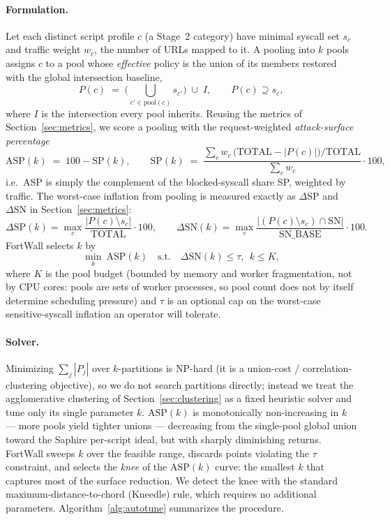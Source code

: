 \paragraph{Formulation.}
Let each distinct script profile $c$ (a Stage~2 category) have minimal syscall
set $s_c$ and traffic weight $w_c$, the number of URLs mapped to it. A pooling
into $k$ pools assigns $c$ to a pool whose \emph{effective} policy is the union
of its members restored with the global intersection baseline,
\begin{equation}
P(c) \;=\; \Big(\textstyle\bigcup_{c'\in \mathrm{pool}(c)} s_{c'}\Big) \;\cup\; I,
\qquad P(c)\supseteq s_c,
\end{equation}
where $I$ is the intersection every pool inherits. Reusing the metrics of
Section~\ref{sec:metrics}, we score a pooling with the request-weighted
\emph{attack-surface percentage}
\begin{equation}
\mathrm{ASP}(k) \;=\; 100 - \mathrm{SP}(k),
\qquad
\mathrm{SP}(k) \;=\; \frac{\sum_c w_c\,\big(\mathrm{TOTAL}-|P(c)|\big)/\mathrm{TOTAL}}{\sum_c w_c}\cdot 100,
\end{equation}
i.e.\ ASP is simply the complement of the blocked-syscall share SP, weighted by
traffic. The worst-case inflation from pooling is measured exactly as
$\Delta\mathrm{SP}$ and $\Delta\mathrm{SN}$ in Section~\ref{sec:metrics}:
\begin{equation}
\Delta\mathrm{SP}(k)=\max_c \frac{|P(c)\setminus s_c|}{\mathrm{TOTAL}}\cdot 100,
\qquad
\Delta\mathrm{SN}(k)=\max_c \frac{|(P(c)\setminus s_c)\cap \mathrm{SN}|}{\mathrm{SN\_BASE}}\cdot 100 .
\end{equation}
FortWall selects $k$ by
\begin{equation}
\min_{k}\ \mathrm{ASP}(k)
\quad\text{s.t.}\quad
\Delta\mathrm{SN}(k)\le \tau,\ \ k\le K,
\label{eq:autotune}
\end{equation}
where $K$ is the pool budget (bounded by memory and worker fragmentation, not by
CPU cores: pools are sets of worker processes, so pool count does not by itself
determine scheduling pressure) and $\tau$ is an optional cap on the worst-case
sensitive-syscall inflation an operator will tolerate.

\paragraph{Solver.}
Minimizing $\sum_j |P_j|$ over $k$-partitions is NP-hard (it is a union-cost /
correlation-clustering objective), so we do not search partitions directly;
instead we treat the agglomerative clustering of Section~\ref{sec:clustering} as
a fixed heuristic solver and tune only its single parameter $k$.
$\mathrm{ASP}(k)$ is monotonically non-increasing in $k$ --- more pools yield
tighter unions --- decreasing from the single-pool global union toward the
Saphire per-script ideal, but with sharply diminishing returns. FortWall sweeps
$k$ over the feasible range, discards points violating the $\tau$ constraint, and
selects the \emph{knee} of the $\mathrm{ASP}(k)$ curve: the smallest $k$ that
captures most of the surface reduction. We detect the knee with the standard
maximum-distance-to-chord (Kneedle) rule, which requires no additional
parameters. Algorithm~\ref{alg:autotune} summarizes the procedure.

